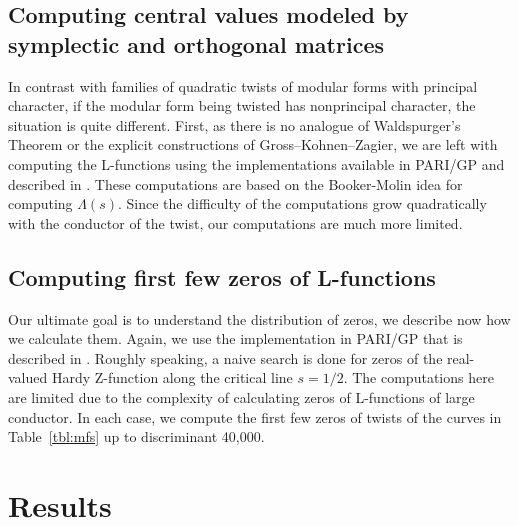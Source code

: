 \documentclass[11pt]{amsart}
\begin{document}
\subsection{Computing central values modeled by symplectic and orthogonal matrices}

In contrast with families of quadratic twists of modular forms with principal character, if the modular form being twisted has nonprincipal character, the situation is quite different.  First, as there is no analogue of Waldspurger's Theorem or the explicit constructions of Gross--Kohnen--Zagier, we are left with computing the L-functions using the implementations available in PARI/GP \cite{pari} and described in \cite{paribook}.  These computations are based on the Booker-Molin idea for computing $\Lambda(s)$.  Since the difficulty of the computations grow quadratically with the conductor of the twist, our computations are much more limited.    

\subsection{Computing first few zeros of L-functions}

Our ultimate goal is to understand the distribution of zeros, we describe now how we calculate them.  Again, we use the implementation in PARI/GP \cite{pari} that is described in \cite{paribook}.  Roughly speaking, a naive search is done for zeros of the real-valued Hardy Z-function along the critical line $s=1/2$. The computations here are limited due to the complexity of calculating zeros of L-functions of large conductor.  In each case, we compute the first few zeros of twists of the curves in Table~\ref{tbl:mfs} up to discriminant 40,000. 





\section{Results}
\end{document}
